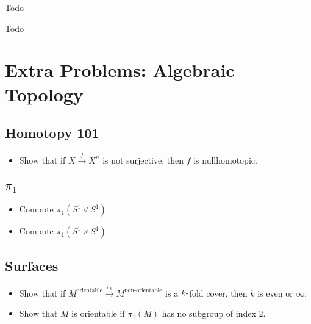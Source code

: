 \begin{theorem}

Todo

\end{theorem}

\begin{theorem}

Todo

\end{theorem}

\hypertarget{extra-problems-algebraic-topology}{%
\section{Extra Problems: Algebraic
Topology}\label{extra-problems-algebraic-topology}}

\hypertarget{homotopy-101}{%
\subsection{Homotopy 101}\label{homotopy-101}}

\begin{itemize}
\tightlist
\item
  Show that if \(X\xrightarrow{f} X^n\) is not surjective, then \(f\) is
  nullhomotopic.
\end{itemize}

\hypertarget{pi_1}{%
\subsection{\texorpdfstring{\(\pi_1\)}{\textbackslash pi\_1}}\label{pi_1}}

\begin{itemize}
\tightlist
\item
  Compute \(\pi_1(S^1 \vee S^1)\)
\item
  Compute \(\pi_1(S^1 \times S^1)\)
\end{itemize}

\hypertarget{surfaces}{%
\subsection{Surfaces}\label{surfaces}}

\begin{itemize}
\tightlist
\item
  Show that if
  \(M^\text{orientable} \xrightarrow{\pi_k} M^\text{non-orientable}\) is
  a \(k{\hbox{-}}\)fold cover, then \(k\) is even or \(\infty\).
\item
  Show that \(M\) is orientable if \(\pi_1(M)\) has no subgroup of index
  2.
\end{itemize}

